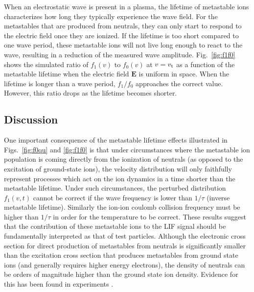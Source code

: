 \documentclass[aip,pop,reprint]{revtex4-1}
\begin{document}
When an electrostatic wave is present in a plasma, the lifetime of metastable ions characterizes how long they typically experience the wave field. For the metastables that are produced from neutrals, they can only start to respond to the electric field once they are ionized. If the lifetime is too short compared to one wave period, these metastable ions will not live long enough to react to the wave, resulting in a reduction of the measured wave amplitude. Fig.~\ref{fig:f1f0} shows the simulated ratio of $f_1(v)$ to $f_0(v)$ at $v=v_\textup{t}$ as a function of the metastable lifetime when the electric field $\mathbf{E}$ is uniform in space. When the lifetime is longer than a wave period, $f_1/f_0$ approaches the correct value. However, this ratio drops as the lifetime becomes shorter. 

\subsection{Discussion}


One important consequence of the metastable lifetime effects illustrated in Figs.~\ref{fig:f0qu} and \ref{fig:f1f0} is that under circumstances where the metastable ion population is coming directly from the ionization of neutrals (as opposed to the excitation of ground-state ions), the velocity distribution will only faithfully represent processes which act on the ion dynamics in a time shorter than the metastable lifetime. Under such circumstances, the perturbed distribution $f_1(v,t)$ cannot be correct if the wave frequency is lower than $1/\tau$ (inverse metastable lifetime). Similarly the ion-ion coulomb collision frequency must be higher than $1/\tau$ in order for the temperature to be correct. These results suggest that the contribution of these metastable ions to the LIF signal should be fundamentally interpreted as that of test particles. Although the electronic cross section for direct production of metastables from neutrals is significantly smaller than the excitation cross section that produces metastables from ground state ions (and generally requires higher energy electrons), the density of neutrals can be orders of magnitude higher than the ground state ion density. Evidence for this has been found in experiments \cite{Cooper}. 
\end{document}
